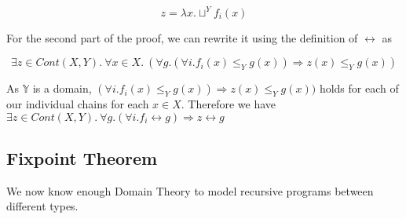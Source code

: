 \[ z = \lambda x. \sqcup^Y f_i (x)\]


For the second part of the proof, we can rewrite it using the definition of $\rel$ as

\[ \exists z \in Cont(X,Y). \  \forall x \in X. \ (\forall g. (\forall i . f_i(x) \leq_Y g(x)) \Rightarrow z(x) \leq_Y g(x)) \]


As $\mathbb{Y}$ is  a domain, $(\forall i . f_i(x) \leq_Y g(x)) \Rightarrow z(x) \leq_Y g(x))$ holds for each of our individual chains for each $x \in X$. Therefore we have $\exists z \in Cont(X,Y). \  \forall g. (\forall i . f_i \rel g) \Rightarrow z \rel g$


\vspace{0.75cm}
%
%


\subsection{Fixpoint Theorem}\label{fixpoint}



We now know enough Domain Theory to model recursive programs between different types.
